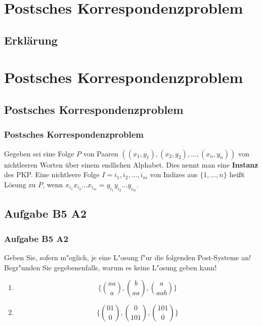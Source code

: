 \section{Postsches Korrespondenzproblem}
\subsection{Erklärung}
\section{Postsches Korrespondenzproblem}
\subsection{Postsches Korrespondenzproblem}
\begin{frame}
\frametitle{Postsches Korrespondenzproblem}
Gegeben sei eine Folge $P$ von Paaren $((x_1, y_1), (x_2, y_2), \ldots, (x_n,y_n))$ von nichtleeren Worten über einem endlichen Alphabet. Dies nennt man eine \textbf{Instanz} des PKP.
Eine nichtleere Folge $I = i_1, i_2, \ldots, i_m$ von Indizes aus $\{1, \ldots, n\}$ heißt Lösung zu $P$, wenn $x_{i_1}x_{i_2}\ldots{}x_{i_m} = y_{i_1}y_{i_2}\ldots{}y_{i_m}$.
\end{frame}
\subsection{Aufgabe B5 A2}
\begin{frame}
	\frametitle{Aufgabe B5 A2}
	Geben Sie, sofern m"oglich, je eine L"osung f"ur die folgenden Post-Systeme an! \\
	Begr"unden Sie gegebenenfalls, warum es keine L"osung geben kann!
	\vspace{5mm}
	\begin{enumerate}
		\item \begin{displaymath} \{ {aa \choose a}, {b \choose aa}, {a \choose aab} \} \end{displaymath}
		\item \begin{displaymath} \{ {01 \choose 0}, {0 \choose 101}, {101 \choose 0} \} \end{displaymath}
	\end{enumerate}
\end{frame}

